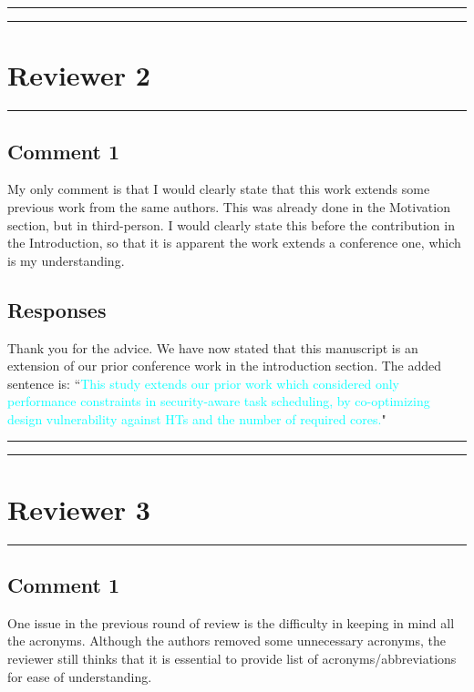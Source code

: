 \documentclass[10pt,journal, compsoc]{IEEEtran}
\begin{document}
\noindent\rule[0.25\baselineskip]{252pt}{1pt}
\noindent\rule[0.25\baselineskip]{252pt}{1pt}

\vspace{10em}


\section*{Reviewer 2}

\noindent\rule[0.25\baselineskip]{252pt}{1pt}

\subsection*{Comment 1}
My only comment is that I would clearly state that this work extends some previous work from the same authors. This was already done in the Motivation section, but in third-person. I would clearly state this before the contribution in the Introduction, so that it is apparent the work extends a conference one, which is my understanding.

\subsection*{Responses}

Thank you for the advice. We have now stated that this manuscript is an extension of our prior conference work \cite{conference:NW} in the introduction section. The added sentence is: ``\textcolor{cyan}{This study extends our prior work \cite{conference:NW} which considered only performance constraints in security-aware task scheduling, by co-optimizing design vulnerability against HTs and the number of required cores.}"

\noindent\rule[0.25\baselineskip]{252pt}{1pt}
\noindent\rule[0.25\baselineskip]{252pt}{1pt}

\vspace{10em}

\section*{Reviewer 3}

\noindent\rule[0.25\baselineskip]{252pt}{1pt}

\subsection*{Comment 1}
One issue in the previous round of review is the difficulty in keeping in mind all the acronyms. Although the authors removed some unnecessary acronyms, the reviewer still thinks that it is essential to provide list of acronyms/abbreviations for ease of understanding.
\end{document}
